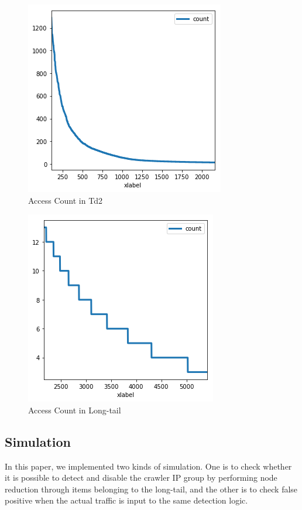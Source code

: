 \documentclass[sigconf,anonymous=false]{acmart}
\begin{document}
\begin{figure}[H]
    \centering
    \includegraphics[width=0.80\columnwidth]{figs/figure_03_td2.png}
    \caption{Access Count in Td2}
    \label{fig:my_label}
\end{figure}

\begin{figure}[H]
    \centering
    \includegraphics[width=0.80\columnwidth]{figs/figure_04_td3.png}
    \caption{Access Count in Long-tail}
    \label{fig:my_label}
\end{figure}

\subsection{Simulation}
In this paper, we implemented two kinds of simulation. One is to check whether it is possible to detect and disable the crawler IP group by performing node reduction through items belonging to the long-tail, and the other is to check false positive when the actual traffic is input to the same detection logic.
\end{document}
